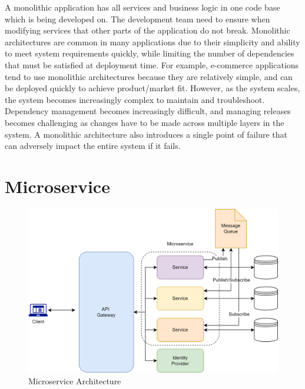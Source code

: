 \documentclass[BIF,Master,nenglish]{twbook}%
\begin{document}
\noindent
A monolithic application has all services and business logic in one code base which is being developed on. The development team need to ensure when modifying services that other parts of the application do not break. Monolithic architectures are common in many applications due to their simplicity and ability to meet system requirements quickly, while limiting the number of dependencies that must be satisfied at deployment time. For example, e-commerce applications tend to use monolithic architectures because they are relatively simple, and can be deployed quickly to achieve product/market fit. However, as the system scales, the system becomes increasingly complex to maintain and troubleshoot. Dependency management becomes increasingly difficult, and managing releases becomes challenging as changes have to be made across multiple layers in the system. A monolithic architecture also introduces a single point of failure that can adversely impact the entire system if it fails.\cite{vil2015}


\section{Microservice}
\begin{figure} [H]
 \begin{center}
    \includegraphics[width=1\linewidth]{img/Microservice.png}
 \end{center}
 \caption{Microservice Architecture}
 \label{microservice}
\end{figure}
\end{document}
